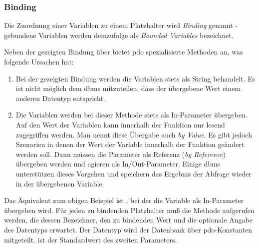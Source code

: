 \subsubsection{Binding}
\label{basics:doctrine:subsubsec:binding}
Die Zuordnung einer Variablen zu einem Platzhalter wird \textit{Binding} genannt - gebundene Variablen werden demzufolge als \textit{Bounded Variables} bezeichnet.

Neben der gezeigten Bindung über  bietet \gls{pdo} spezialisierte Methoden an, was folgende Ursachen hat:

\begin{enumerate}
	\item Bei der gezeigten Bindung werden die Variablen stets als String behandelt. Es ist nicht möglich dem \gls{dbms} mitzuteilen, dass der übergebene Wert einem anderen Datentyp entspricht.
	\item Die Variablen werden bei dieser Methode stets als In-Parameter übergeben. Auf den Wert der Variablen kann innerhalb der Funktion nur lesend zugegriffen werden. Man nennt diese Übergabe auch \textit{by Value}. Es gibt jedoch Szenarien in denen der Wert der Variable innerhalb der Funktion geändert werden soll. Dann müssen die Parameter als Referenz (\textit{by Reference}) übergeben werden und agieren als In/Out-Parameter. Einige \gls{dbms} unterstützen dieses Vorgehen und speichern das Ergebnis der Abfrage wieder in der übergebenen Variable.
\end{enumerate}

Das Äquivalent zum obigen Beispiel ist , bei der die Variable als In-Parameter übergeben wird. Für jeden zu bindenden Platzhalter muß die Methode aufgerufen werden, die dessen Bezeichner, den zu bindenden Wert und die optionale Angabe des Datentyps erwartet. Der Datentyp wird der Datenbank über \gls{pdo}-Konstanten mitgeteilt.  ist der Standardwert des zweiten Parameters.

\begin{listing}[H]
\caption{}
\label{lst:insertBindValue}
\end{listing}

